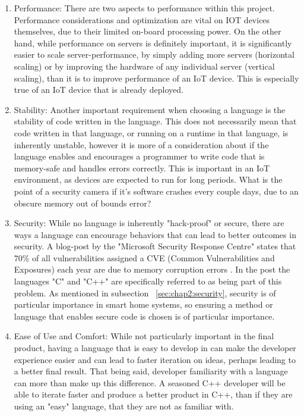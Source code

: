 \begin{enumerate} 
    \item Performance: There are two aspects to performance within this project. Performance considerations and optimization are vital on IOT devices themselves, due to their limited on-board processing power. On the other hand, while performance on servers is definitely important, it is significantly easier to scale server-performance, by simply adding more servers (horizontal scaling) or by improving the hardware of any individual server (vertical scaling), than it is to improve performance of an IoT device. This is especially true of an IoT device that is already deployed.
    \item Stability: Another important requirement when choosing a language is the stability of code written in the language. This does not necessarily mean that code written in that language, or running on a runtime in that language, is inherently unstable, however it is more of a consideration about if the language enables and encourages a programmer to write code that is memory-safe and handles errors correctly. This is important in an IoT environment, as devices are expected to run for long periods. What is the point of a security camera if it's software crashes every couple days, due to an obscure memory out of bounds error? 
    \item Security: While no language is inherently "hack-proof" or secure, there are ways a language can encourage behaviors that can lead to better outcomes in security. A blog-post by the "Microsoft Security Response Centre" states that 70\% of all vulnerabilities assigned a CVE (Common Vulnerabilities and Exposures) each year are due to memory corruption errors \cite{ProactiveApproachToSecureCode}. In the post the languages "C" and "C++" are specifically referred to as being part of this problem. As mentioned in subsection ~\ref{sec:chap2:security}, security is of particular importance in smart home systems, so ensuring a method or language that enables secure code is chosen is of particular importance. 
    \item Ease of Use and Comfort: While not particularly important in the final product, having a language that is easy to develop in can make the developer experience easier and can lead to faster iteration on ideas, perhaps leading to a better final result. That being said, developer familiarity with a language can more than make up this difference. A seasoned C++ developer will be able to iterate faster and produce a better product in C++, than if they are using an "easy" language, that they are not as familiar with.
\end{enumerate}
